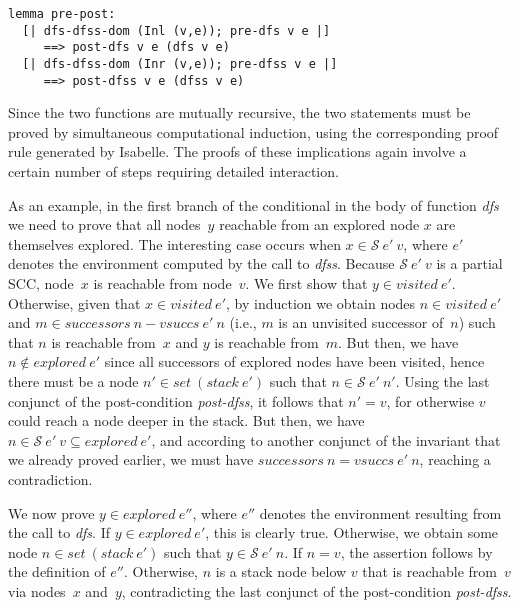 \documentclass[sigplan,10pt,anonymous,review]{acmart}
\newcommand{\prog}[1]{\textit{#1}}
\renewcommand{\SS}{\mathcal{S}}
\begin{document}
\begin{small}
\begin{lstlisting}[language=isabelle]
lemma pre-post:
  [| dfs-dfss-dom (Inl (v,e)); pre-dfs v e |] 
     ==> post-dfs v e (dfs v e)
  [| dfs-dfss-dom (Inr (v,e)); pre-dfss v e |]
     ==> post-dfss v e (dfss v e)
\end{lstlisting}
\end{small}

Since the two functions are mutually recursive, the two statements must be proved by simultaneous computational induction, using the corresponding proof rule generated by Isabelle. The proofs of these implications again involve a certain number of steps requiring detailed interaction.

As an example, in the first branch of the conditional in the body of function \prog{dfs} we need to prove that all nodes~$y$ reachable from an explored node $x$ are themselves explored. The interesting case occurs when $x \in \SS~e'~v$, where $e'$ denotes the environment computed by the call to \prog{dfss}. Because $\SS~e'~v$ is a partial SCC, node~$x$ is reachable from node~$v$. We first show that $y \in \prog{visited}~e'$. Otherwise, given that $x \in \prog{visited}~e'$, by induction we obtain nodes $n \in \prog{visited}~e'$ and $m \in \prog{successors}~n - \prog{vsuccs}~e'~n$ (i.e., $m$ is an unvisited successor of~$n$) such that $n$ is reachable from~$x$ and $y$ is reachable from~$m$. But then, we have $n \notin \prog{explored}~e'$ since all successors of explored nodes have been visited, hence there must be a node $n' \in \prog{set}~(\prog{stack}~e')$ such that $n \in \SS~e'~n'$. Using the last conjunct of the post-condition \prog{post-dfss}, it follows that $n' = v$, for otherwise $v$ could reach a node deeper in the stack. But then, we have $n \in \SS~e'~v \subseteq \prog{explored}~e'$, and according to another conjunct of the invariant that we already proved earlier, we must have $\prog{successors}~n = \prog{vsuccs}~e'~n$, reaching a contradiction.

We now prove $y \in \prog{explored}~e''$, where $e''$ denotes the environment resulting from the call to \prog{dfs}. If $y \in \prog{explored}~e'$, this is clearly true. Otherwise, we obtain some node $n \in \prog{set}~(\prog{stack}~e')$ such that $y \in \SS~e'~n$. If $n=v$, the assertion follows by the definition of $e''$. Otherwise, $n$ is a stack node below $v$ that is reachable from~$v$ via nodes~$x$ and~$y$, contradicting the last conjunct of the post-condition \prog{post-dfss}.
\end{document}
